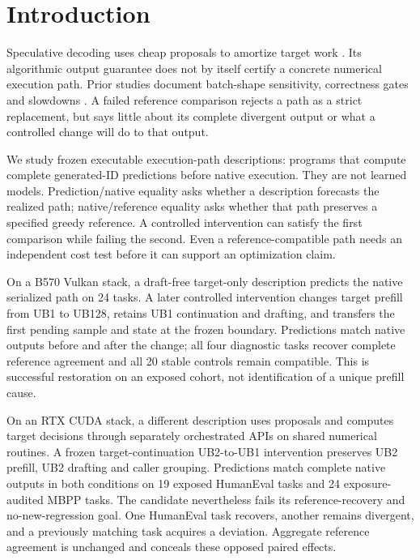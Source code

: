 \section{Introduction}
\label{sec:intro}
Speculative decoding uses cheap proposals to amortize target work \citep{leviathan2023}. Its algorithmic output guarantee does not by itself certify a concrete numerical execution path. Prior studies document batch-shape sensitivity, correctness gates and slowdowns \citep{lossless,numerics,batchcorrect}. A failed reference comparison rejects a path as a strict replacement, but says little about its complete divergent output or what a controlled change will do to that output.

We study frozen executable execution-path descriptions: programs that compute complete generated-ID predictions before native execution. They are not learned models. Prediction/native equality asks whether a description forecasts the realized path; native/reference equality asks whether that path preserves a specified greedy reference. A controlled intervention can satisfy the first comparison while failing the second. Even a reference-compatible path needs an independent cost test before it can support an optimization claim.

On a B570 Vulkan stack, a draft-free target-only description predicts the native serialized path on 24 tasks. A later controlled intervention changes target prefill from UB1 to UB128, retains UB1 continuation and drafting, and transfers the first pending sample and state at the frozen boundary. Predictions match native outputs before and after the change; all four diagnostic tasks recover complete reference agreement and all 20 stable controls remain compatible. This is successful restoration on an exposed cohort, not identification of a unique prefill cause.

On an RTX CUDA stack, a different description uses proposals and computes target decisions through separately orchestrated APIs on shared numerical routines. A frozen target-continuation UB2-to-UB1 intervention preserves UB2 prefill, UB2 drafting and caller grouping. Predictions match complete native outputs in both conditions on 19 exposed HumanEval tasks and 24 exposure-audited MBPP tasks. The candidate nevertheless fails its reference-recovery and no-new-regression goal. One HumanEval task recovers, another remains divergent, and a previously matching task acquires a deviation. Aggregate reference agreement is unchanged and conceals these opposed paired effects.

